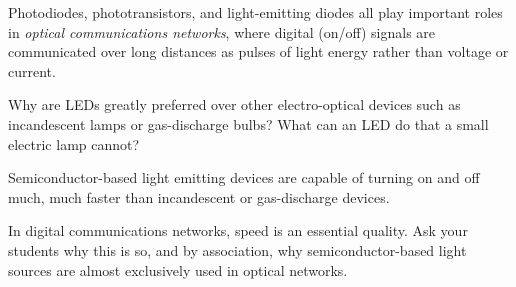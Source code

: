 

Photodiodes, phototransistors, and light-emitting diodes all play important roles in {\it optical communications networks}, where digital (on/off) signals are communicated over long distances as pulses of light energy rather than voltage or current.

Why are LEDs greatly preferred over other electro-optical devices such as incandescent lamps or gas-discharge bulbs?  What can an LED do that a small electric lamp cannot?







Semiconductor-based light emitting devices are capable of turning on and off much, much faster than incandescent or gas-discharge devices.







In digital communications networks, speed is an essential quality.  Ask your students why this is so, and by association, why semiconductor-based light sources are almost exclusively used in optical networks.




